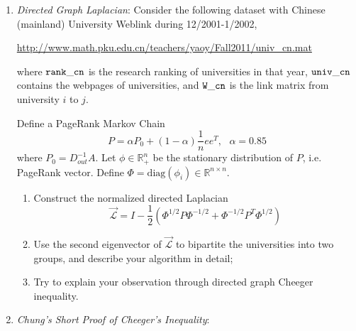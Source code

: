 \documentclass[11pt]{article}
\def\R{{\mathbb R}}
\def\diag{{\mathrm{diag}}}
\begin{document}
\begin{enumerate}
\item {\em Directed Graph Laplacian}: Consider the following dataset with Chinese (mainland) University Weblink during 12/2001-1/2002,

\url{http://www.math.pku.edu.cn/teachers/yaoy/Fall2011/univ_cn.mat}

where $\tt{rank\_{}cn}$ is the research ranking of universities in that year, $\tt{univ\_{}cn}$ contains the webpages of universities, and $\tt{W\_{}cn}$ is the link matrix from university
$i$ to $j$. 

Define a PageRank Markov Chain
\[  P = \alpha P_0 + (1-\alpha) \frac{1}{n} e e^T, \ \ \ \alpha = 0.85 \]
where $P_0 = D_{out}^{-1} A$. Let $\phi\in \R_+^n$ be the stationary distribution of $P$, i.e. PageRank vector. Define $\Phi = \diag(\phi_i)\in \R^{n\times n}$.
\begin{enumerate}
\item Construct the normalized directed Laplacian 
\[ \mathcal{\vec{L}}=I - \frac{1}{2}(\Phi^{1/2} P \Phi^{-1/2} + \Phi^{-1/2} P^T \Phi^{1/2} ) \]
\item Use the second eigenvector of $\mathcal{\vec{L}}$ to bipartite the universities into two groups, and describe your algorithm in detail;
\item Try to explain your observation through directed graph Cheeger inequality.
\end{enumerate} 
  
%
%


\item {\em *Chung's Short Proof of Cheeger's Inequality}: 


\end{enumerate}
\end{document}
